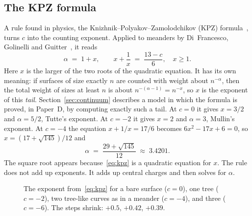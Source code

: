 \subsection{The KPZ formula}

A rule found in physics, the Knizhnik--Polyakov--Zamolodchikov (KPZ) formula~\cite{KPZ}, turns
$c$ into the counting exponent. Applied to meanders by Di~Francesco, Golinelli and
Guitter~\cite{DGG}, it reads
\begin{equation}\label{eq:kpz}
\alpha \;=\; 1+x, \qquad x+\frac1x \;=\; \frac{13-c}{6},\quad x\ge1.
\end{equation}
Here $x$ is the larger of the two roots of the quadratic equation. It has its own meaning: if
surfaces of size exactly $n$ are counted with weight about $n^{-\alpha}$, then the total weight of
sizes at least $n$ is about $n^{-(\alpha-1)}=n^{-x}$, so $x$ is the exponent of this \emph{tail}.
Section~\ref{sec:continuum} describes a model in which the formula is proved, in Paper~D, by
computing exactly such a tail.
At $c=0$ it gives $x=3/2$ and $\alpha=5/2$, Tutte's exponent. At $c=-2$ it gives $x=2$ and
$\alpha=3$, Mullin's exponent. At $c=-4$ the equation $x+1/x=17/6$ becomes $6x^2-17x+6=0$, so
$x=(17+\sqrt{145})/12$ and
\[ \alpha \;=\; \frac{29+\sqrt{145}}{12}\;\approx\;3.4201 .\]
The square root appears because~\eqref{eq:kpz} is a quadratic equation for $x$. The rule does
not add up exponents. It adds up central charges and then solves for $\alpha$.

\begin{figure}[t]
\centering
{}
\caption{The exponent from~\eqref{eq:kpz} for a bare surface ($c=0$), one tree ($c=-2$), two
tree-like curves as in a meander ($c=-4$), and three ($c=-6$). The steps shrink: $+0.5$,
$+0.42$, $+0.39$.}
\label{fig:staircase}
\end{figure}

